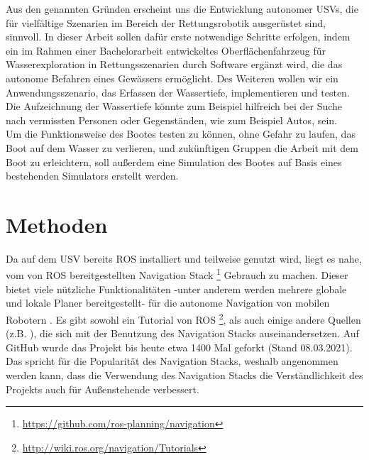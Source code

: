 \documentclass[11pt]{article}
\begin{document}
Aus den genannten Gründen erscheint uns die Entwicklung autonomer USVs, die für vielfältige Szenarien im Bereich der Rettungsrobotik ausgerüstet sind, sinnvoll. In dieser Arbeit sollen dafür erste notwendige Schritte erfolgen, indem ein im Rahmen einer Bachelorarbeit entwickeltes Oberflächenfahrzeug für Wasserexploration in Rettungsszenarien durch Software ergänzt wird, die das autonome Befahren eines Gewässers ermöglicht. Des Weiteren wollen wir ein Anwendungsszenario, das Erfassen der Wassertiefe, implementieren und testen. Die Aufzeichnung der Wassertiefe könnte zum Beispiel hilfreich bei der Suche nach vermissten Personen oder Gegenständen, wie zum Beispiel Autos, sein.\\

Um die Funktionsweise des Bootes testen zu können, ohne Gefahr zu laufen, das Boot auf dem Wasser zu verlieren, und zukünftigen Gruppen die Arbeit mit dem Boot zu erleichtern, soll außerdem eine Simulation des Bootes auf Basis eines bestehenden Simulators erstellt werden.

\section{Methoden}
Da auf dem USV bereits ROS installiert und teilweise genutzt wird, liegt es nahe, vom von ROS bereitgestellten Navigation Stack \footnote{\url{https://github.com/ros-planning/navigation}} Gebrauch zu machen. Dieser bietet viele nützliche Funktionalitäten -unter anderem werden mehrere globale und lokale Planer bereitgestellt- für die autonome Navigation von mobilen Robotern \cite{zheng2019ros}. Es gibt sowohl ein Tutorial von ROS \footnote{\url{http://wiki.ros.org/navigation/Tutorials}}, als auch einige andere Quellen (z.B. \cite{zheng2019ros}), die sich mit der Benutzung des Navigation Stacks auseinandersetzen. Auf GitHub wurde das Projekt bis heute etwa 1400 Mal geforkt (Stand 08.03.2021). Das spricht für die Popularität des Navigation Stacks, weshalb angenommen werden kann, dass die Verwendung des Navigation Stacks die Verständlichkeit des Projekts auch für Außenstehende verbessert.
\end{document}
